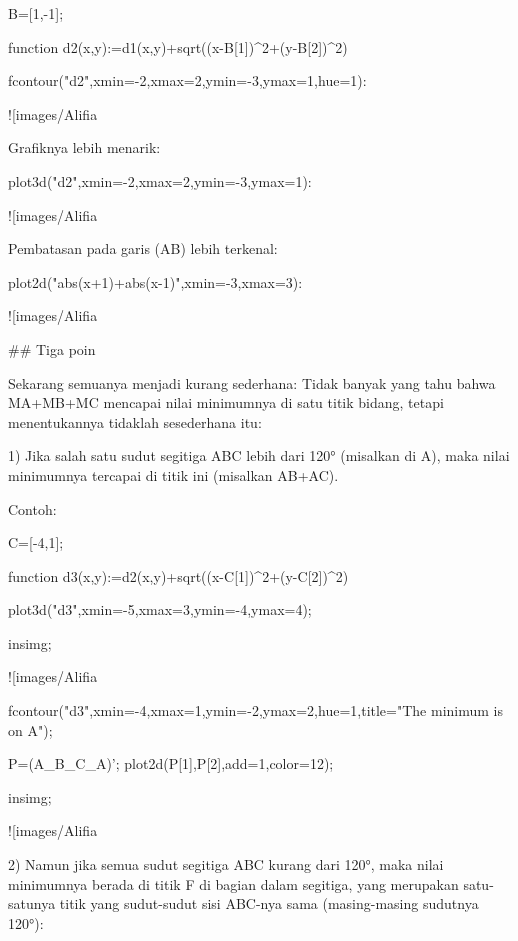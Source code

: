 \documentclass{article}
\begin{document}
\>B=[1,-1];

\>function d2(x,y):=d1(x,y)+sqrt((x-B[1])^2+(y-B[2])^2)

\>fcontour("d2",xmin=-2,xmax=2,ymin=-3,ymax=1,hue=1):


![images/Alifia%

Grafiknya lebih menarik:


\>plot3d("d2",xmin=-2,xmax=2,ymin=-3,ymax=1):


![images/Alifia%

Pembatasan pada garis (AB) lebih terkenal:


\>plot2d("abs(x+1)+abs(x-1)",xmin=-3,xmax=3):


![images/Alifia%

## Tiga poin

Sekarang semuanya menjadi kurang sederhana: Tidak banyak yang tahu
bahwa MA+MB+MC mencapai nilai minimumnya di satu titik bidang, tetapi
menentukannya tidaklah sesederhana itu:


1) Jika salah satu sudut segitiga ABC lebih dari 120° (misalkan di A),
maka nilai minimumnya tercapai di titik ini (misalkan AB+AC).


Contoh:


\>C=[-4,1];

\>function d3(x,y):=d2(x,y)+sqrt((x-C[1])^2+(y-C[2])^2)

\>plot3d("d3",xmin=-5,xmax=3,ymin=-4,ymax=4);

\>insimg;


![images/Alifia%

\>fcontour("d3",xmin=-4,xmax=1,ymin=-2,ymax=2,hue=1,title="The minimum is on A");

\>P=(A\_B\_C\_A)'; plot2d(P[1],P[2],add=1,color=12);

\>insimg;


![images/Alifia%

2) Namun jika semua sudut segitiga ABC kurang dari 120°, maka nilai
minimumnya berada di titik F di bagian dalam segitiga, yang merupakan
satu-satunya titik yang sudut-sudut sisi ABC-nya sama (masing-masing
sudutnya 120°):
\end{document}
